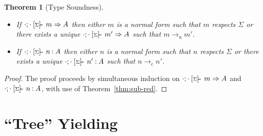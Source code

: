\documentclass[msc,deptreport,cs]{infthesis} %
\newtheorem{theorem}{Theorem}
\newcommand{\sigentails}[1]{\mathbin{[{\text{\scriptsize ${#1}$}}]\hspace{-0.4ex}\text{-\!-}}\,}
\newcommand{\inferbase}[5]{#1; #3 \mathbin{#2} {#4} \Rightarrow {#5}}
\newcommand{\checkbase}[5]{#1; #3 \mathbin{#2} #5 \mathbin{:} #4}
\newcommand{\makes}[5]{\inferbase{#1}{\sigentails{#3}}{#2}{#4}{#5}}
\newcommand{\has}[5]{\checkbase{#1}{\sigentails{#3}}{#2}{#4}{#5}}
\newcommand{\infers}{\makes}
\newcommand{\checks}{\has}
\newcommand{\sigs}{\Sigma}
\newcommand{\nowt}{\emptyset}
\newcommand{\stepstou}{\longrightarrow_{\mathrm{u}}}
\newcommand{\stepstoc}{\longrightarrow_{\mathrm{c}}}
\begin{document}
\begin{theorem}[Type Soundness]\label{thm:soundness}
\begin{itemize}
\\
\item If $\infers{\cdot}{\cdot}{\sigs}{m}{A}$ then either $m$ is a normal form
  such that $m$ respects $\sigs$ or there exists a unique
  $\infers{\cdot}{\cdot}{\sigs}{m'}{A}$ such that $m \stepstou m'$.
\item If $\checks{\cdot}{\cdot}{\sigs}{A}{n}$ then either $n$ is a normal form
  such that $n$ respects $\sigs$ or there exists a unique
  $\checks{\cdot}{\cdot}{\sigs}{A}{n'}$ such that $n \stepstoc n'$.
\end{itemize}
\end{theorem}

\begin{proof}
The proof proceeds by simultaneous induction on
$\infers{\cdot}{\cdot}{\sigs}{m}{A}$ and $\checks{\cdot}{\cdot}{\sigs}{A}{n}$,
with use of Theorem~\ref{thm:sub-red}.
\end{proof}


\section{``Tree'' Yielding}
\end{document}
